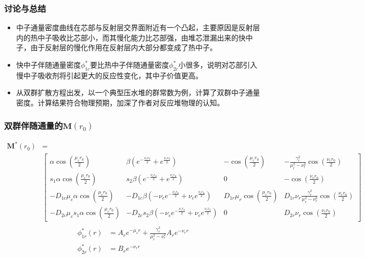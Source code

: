 \documentclass[handout,10pt]{beamer}
\begin{document}
\begin{frame}
\frametitle{讨论与总结}
\begin{itemize}
    \item 中子通量密度曲线在芯部与反射层交界面附近有一个凸起，主要原因是反射层内的热中子吸收比芯部小，而其慢化能力比芯部强，由堆芯泄漏出来的快中子，由于反射层的慢化作用在反射层内大部分都变成了热中子。
    \item 快中子伴随通量密度$\phi^*_{1c}$要比热中子伴随通量密度$\phi^*_{2c}$小很多，说明对芯部引入慢中子吸收剂将引起更大的反应性变化，其中子价值更高。
    \item 从双群扩散方程出发，以一个典型压水堆的群常数为例，计算了双群中子通量密度。计算结果符合物理预期，加深了作者对反应堆物理的认知。
\end{itemize}
\end{frame}

\appendix
\begin{frame}
\frametitle{双群伴随通量的$\pmb{M}(r_0)$}
\tiny
\begin{align*}
    \pmb{M}^*(r_0) &= \\ 
    &\begin{bmatrix}
        \alpha\cos(\frac{\mu_c r_0}{2}) & \beta(e^{-\frac{\nu_c r_0}{2}}+e^{\frac{\nu_c r_0}{2}}) & -\cos(\frac{\mu_r r_0}{2}) & -\frac{\gamma_r^2}{\mu_r^2 - \nu_r^2}\cos(\frac{\nu_r r_0}{2}) \\
        s_1\alpha\cos(\frac{\mu_c r_0}{2}) & s_2\beta(e^{-\frac{\nu_c r_0}{2}}+e^{\frac{\nu_c r_0}{2}}) & 0 & -\cos(\frac{\nu_r r_0}{2}) \\
        -D_{1c}\mu_c\alpha\cos(\frac{\mu_c r_0}{2}) & -D_{1c}\beta(-\nu_c e^{-\frac{\nu_c r_0}{2}}+\nu_c e^{\frac{\nu_c r_0}{2}}) & D_{1r}\mu_r\cos(\frac{\mu_r r_0}{2}) & D_{1r}\nu_r\frac{\gamma_r^2}{\mu_r^2 - \nu_r^2}\cos(\frac{\nu_r r_0}{2}) \\
        -D_{2c}\mu_c s_1\alpha\cos(\frac{\mu_c r_0}{2}) & -D_{2c}s_2\beta(-\nu_c e^{-\frac{\nu_c r_0}{2}}+\nu_c e^{\frac{\nu_c r_0}{2}}) & 0 & D_{2r}\nu_r \cos(\frac{\nu_r r_0}{2})
    \end{bmatrix}
\end{align*}
\normalsize
\begin{align*}
    \begin{split}
        \phi_{1r}^*(r) &= A_r e^{-\mu_r r} + \frac{\gamma_r^2}{\mu_r^2 - \nu_r^2}A_r e^{-\nu_r r} \\
        \phi_{2r}^*(r) &= B_r e^{-\nu_r r}
    \end{split}
\end{align*}
\end{frame}
\end{document}
